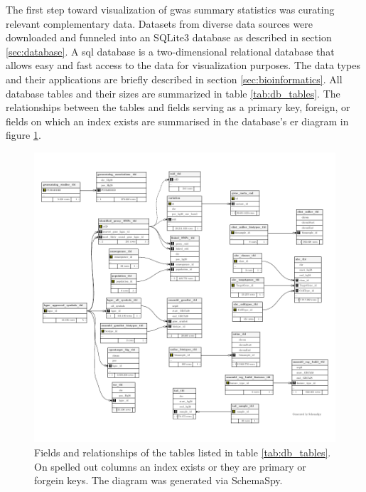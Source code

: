     The first step toward visualization of \ac{gwas} summary statistics was curating relevant complementary data. Datasets from diverse data sources were downloaded and funneled into an SQLite3 database as described in section \ref{sec:database}. A \ac{sql} database is a two-dimensional relational database that allows easy and fast access to the data for visualization purposes. The data types and their applications are briefly described in section \ref{sec:bioinformatics}. All database tables and their sizes are summarized in table \ref{tab:db_tables}. The relationships between the tables and fields serving as a primary key, foreign, or fields on which an index exists are summarised in the database's \ac{er} diagram in figure \ref{fig:db_er}.

    \begin{figure}[h!]
    \capstart
        \centering
        \includegraphics{Abbildung/db-schema.pdf}

        \begin{minipage}{\captionwidth}
            \caption[database]{\newline
            Fields and relationships of the tables listed in table \ref{tab:db_tables}. On spelled out columns an index exists or they are primary or forgein keys. The diagram was generated via SchemaSpy.}
            \label{fig:db_er}
        \end{minipage}
    \end{figure}

